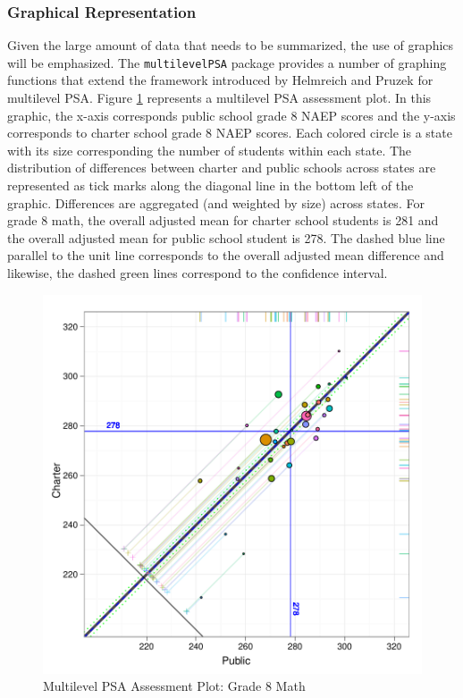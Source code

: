 \documentclass[letterpaper,12p,twoside]{article} %
\begin{document}
\subsubsection{Graphical Representation}
Given the large amount of data that needs to be summarized, the use of graphics will be emphasized. The \texttt{multilevelPSA} package provides a number of graphing functions that extend the framework introduced by Helmreich and Pruzek for multilevel PSA. Figure \ref{fig:g8math:circ} represents a multilevel PSA assessment plot. In this graphic, the x-axis corresponds public school grade 8 NAEP scores and the y-axis corresponds to charter school grade 8 NAEP scores. Each colored circle is a state with its size corresponding the number of students within each state. The distribution of differences between charter and public schools across states are represented as tick marks along the diagonal line in the bottom left of the graphic. Differences are aggregated (and weighted by size) across states. For grade 8 math, the overall adjusted mean for charter school students is 281 and the overall adjusted mean for public school student is 278. The dashed blue line parallel to the unit line corresponds to the overall adjusted mean difference and likewise, the dashed green lines correspond to the confidence interval.

\begin{figure}[tp]
\begin{center}
\includegraphics[width=\textwidth]{../Figures/g8mathlrcircplot.pdf}
\caption{Multilevel PSA Assessment Plot: Grade 8 Math}
\label{fig:g8math:circ}
\end{center}
\end{figure}
\end{document}
